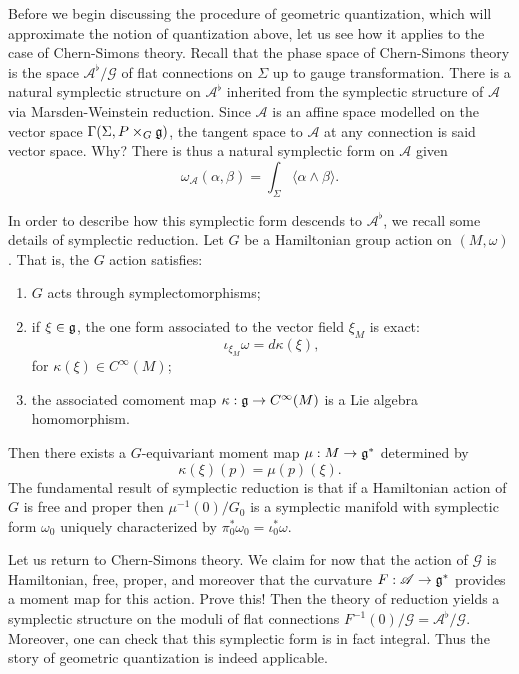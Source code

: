 \documentclass{amsart}
\begin{document}
Before we begin discussing the procedure of geometric quantization, which will approximate the
notion of quantization above, let us see how it applies to the case of Chern-Simons theory.
Recall that the phase space of Chern-Simons theory is the space $\mathscr{A}^\flat/\mathscr{G}$
of flat connections on $\Sigma$ up to gauge transformation. There is a natural symplectic structure on
$\mathscr{A}^\flat$ inherited from the symplectic structure of $\mathscr{A}$ via Marsden-Weinstein reduction.
Since $\mathscr{A}$ is an affine space modelled on the vector space $\Gamma(\Sigma,P\times_G\mathfrak g)$, the
tangent space to $\mathscr{A}$ at any connection is said vector space. {\color{red} Why?}
There is thus a natural symplectic form on $\mathscr{A}$ given
\begin{equation*}
    \omega_\mathscr{A}(\alpha,\beta) = \int_\Sigma \langle \alpha\wedge\beta\rangle.
\end{equation*}

In order to describe how this symplectic form descends to $\mathscr{A}^\flat$, we recall some details
of symplectic reduction. Let $G$ be a Hamiltonian group action on $(M,\omega)$. That is, the $G$
action satisfies:
\begin{enumerate}
    \item $G$ acts through symplectomorphisms;
    \item if $\xi\in\mathfrak g$, the one form associated to the vector field $\xi_M$ is exact:
        \begin{equation*}
            \iota_{\xi_M}\omega = d\kappa(\xi),
        \end{equation*}
        for $\kappa(\xi)\in C^\infty(M)$;
    \item the associated comoment map $\kappa:\mathfrak g\to C^\infty(M)$ is a Lie algebra homomorphism.
\end{enumerate}
Then there exists a $G$-equivariant moment map $\mu:M\to\mathfrak g^*$ determined by
\begin{equation*}
    \kappa(\xi)(p) = \mu(p)(\xi).
\end{equation*}
The fundamental result of symplectic reduction is that if a Hamiltonian action of $G$ is free and proper
then $\mu^{-1}(0)/G_0$ is a symplectic manifold with symplectic form $\omega_0$ uniquely
characterized by $\pi_0^*\omega_0 = \iota_0^*\omega$.

Let us return to Chern-Simons theory. We claim for now that the action of $\mathscr{G}$ is Hamiltonian,
free, proper, and moreover that the curvature $F:\mathscr{A}\to\mathfrak g^*$ provides a moment map for this action.
{\color{red} Prove this!} Then the theory of reduction yields a symplectic structure on
the moduli of flat connections $F^{-1}(0)/\mathscr{G}=\mathscr{A}^\flat/\mathscr{G}$. Moreover,
one can check that this symplectic form is in fact integral. Thus the story of geometric quantization is
indeed applicable.
\end{document}
